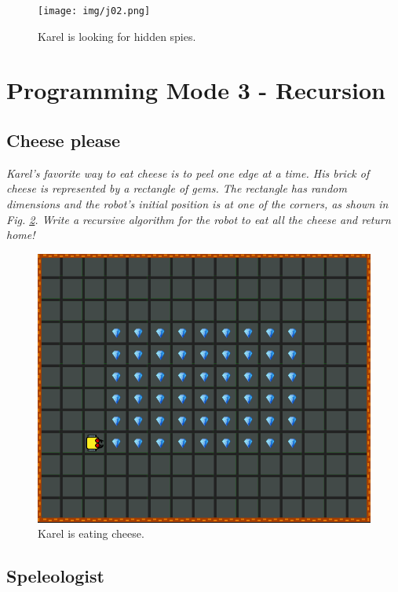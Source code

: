 \begin{figure}[!ht]
\begin{center}
\texttt{[image: img/j02.png]}
\end{center}
\vspace{-4mm}
\caption{Karel is looking for hidden spies.}
\label{fig:j02}
\end{figure}
\noindent

\newpage

\section{Programming Mode 3 - Recursion}

\subsection{Cheese please}

{\em Karel's favorite way to eat cheese is to peel one edge at a time. His brick of 
cheese is represented by a rectangle of gems. The rectangle has random dimensions
and the robot's initial position is at one of the corners, as shown in Fig. \ref{fig:g01}.
Write a recursive algorithm for the robot to eat all the cheese and return home!
 }
\begin{figure}[!ht]
\begin{center}
\includegraphics[height=0.4\textwidth]{img/g01.png}
\end{center}
\vspace{-4mm}
\caption{Karel is eating cheese.}
\label{fig:g01}
\vspace{-1cm}
\end{figure}
\newpage


\subsection{Speleologist}

